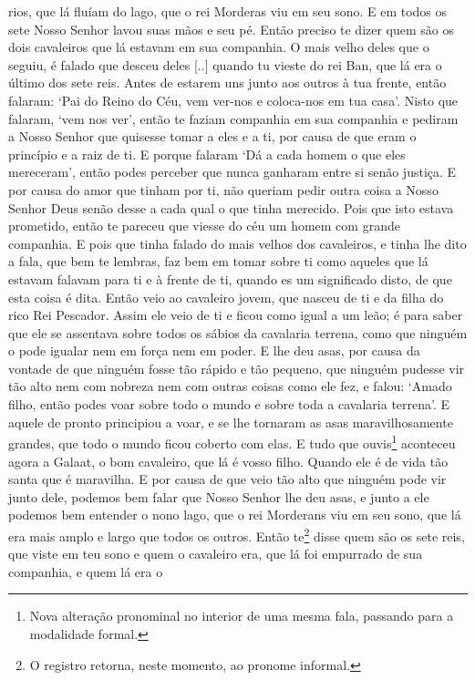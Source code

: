 rios, que lá fluíam do lago, que o rei Morderas viu em seu sono. E em todos os
sete Nosso Senhor lavou suas mãos e seu pé. Então preciso te dizer quem são os
dois cavaleiros que lá estavam em sua companhia. O mais velho deles que o
seguiu, é falado que desceu deles [..] quando tu vieste do rei Ban, que lá era
o último dos sete reis. Antes de estarem uns junto aos outros à tua frente,
então falaram: ‘Pai do Reino do Céu, vem ver-nos e coloca-nos em tua casa’.
Nisto que falaram, ‘vem nos ver’, então te faziam companhia em sua companhia e
pediram a Nosso Senhor que quisesse tomar a eles e a ti, por causa de que eram
o princípio e a raiz de ti. E porque falaram ‘Dá a cada homem o que eles
mereceram’, então podes perceber que nunca ganharam entre si senão justiça. E
por causa do amor que tinham por ti, não queriam pedir outra coisa a Nosso
Senhor Deus senão desse a cada qual o que tinha merecido. Pois que isto estava
prometido, então te pareceu que viesse do céu um homem com grande companhia. E
pois que tinha falado do mais velhos dos cavaleiros, e tinha lhe dito a fala,
que bem te lembras, faz bem em tomar sobre ti como aqueles que lá estavam
falavam para ti e à frente de ti, quando es um significado disto, de que esta
coisa é dita. Então veio ao cavaleiro jovem, que nasceu de ti e da filha do
rico Rei Pescador. Assim ele veio de ti e ficou como igual a um leão; é para
saber que ele se assentava sobre todos os sábios da cavalaria terrena, como que
ninguém o pode igualar nem em força nem em poder. E lhe deu asas, por causa da
vontade de que ninguém fosse tão rápido e tão pequeno, que ninguém pudesse vir
tão alto nem com nobreza nem com outras coisas como ele fez, e falou: ‘Amado
filho, então podes voar sobre todo o mundo e sobre toda a cavalaria terrena’. E
aquele de pronto principiou a voar, e se lhe tornaram as asas maravilhosamente
grandes, que todo o mundo ficou coberto com elas. E tudo que ouvis\footnote{
Nova alteração pronominal no interior de uma mesma fala, passando para a
modalidade formal.}  aconteceu agora a Galaat, o bom cavaleiro, que
lá é vosso filho. Quando ele é de vida tão santa que é maravilha. E por causa
de que veio tão alto que ninguém pode vir junto dele, podemos bem falar que
Nosso Senhor lhe deu asas, e junto a ele podemos bem entender o nono lago, que
o rei Morderans viu em seu sono, que lá era mais amplo e largo que todos os
outros. Então te\footnote{ O registro retorna, neste momento, ao pronome
informal.}  disse quem são os sete reis, que viste em teu sono e
quem o cavaleiro era, que lá foi empurrado de sua companhia, e quem lá era o
